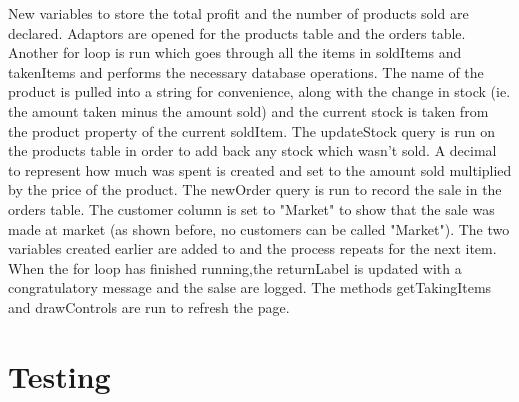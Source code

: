 ﻿\documentclass{article}
\begin{document}
\begin{itemize}
        New variables to store the total profit and the number of products sold are declared.
        Adaptors are opened for the products table and the orders table.
        Another for loop is run which goes through all the items in soldItems and takenItems and performs the necessary database operations.
        The name of the product is pulled into a string for convenience, along with the change in stock (ie. the amount taken minus the amount sold) and the current stock is taken from the product property of the current soldItem.
        The updateStock query is run on the products table in order to add back any stock which wasn't sold.
        A decimal to represent how much was spent is created and set to the amount sold multiplied by the price of the product.
        The newOrder query is run to record the sale in the orders table.
        The customer column is set to "Market" to show that the sale was made at market (as shown before, no customers can be called "Market").
        The two variables created earlier are added to and the process repeats for the next item.
        \\
        When the for loop has finished running,the returnLabel is updated with a congratulatory message and the salse are logged.
        The methods getTakingItems and drawControls are run to refresh the page.
    \end{itemize}
    \section{Testing}
\end{document}
